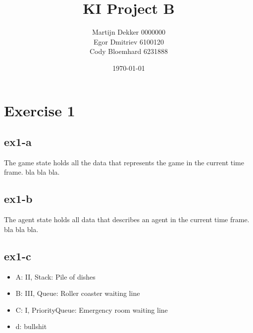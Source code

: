 \documentclass[a4paper]{article}
\title{KI Project B}
\author{
Martijn Dekker  0000000 \\
Egor Dmitriev   6100120 \\
Cody Bloemhard  6231888 \\
}
\date{\today}
\begin{document}
\maketitle

\section{Exercise 1}
\label{sec:ex1}
\subsection{ex1-a}
The game state holds all the data that represents the game in the current time frame. bla bla bla.
\subsection{ex1-b}
The agent state holds all data that describes an agent in the current time frame. bla bla bla.
\subsection{ex1-c}
\begin{itemize}
\item A: II, Stack: Pile of dishes
\item B: III, Queue: Roller coaster waiting line
\item C: I, PriorityQueue: Emergency room waiting line
\item d: bullshit
\end{itemize}
\end{document}
